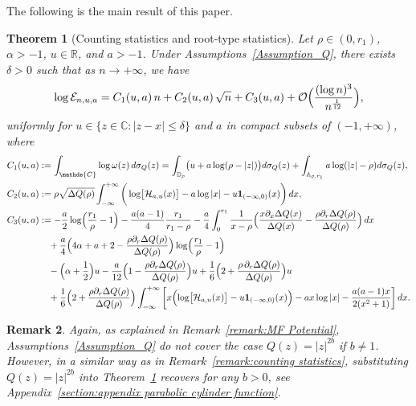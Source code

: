 \documentclass[reqno]{amsart}
\newcommand{\1}{\mathds{1}}
\newcommand{\C}{\mathds{C}}
\newcommand{\R}{\mathds{R}}
\numberwithin{equation}{section}
\newtheorem{theorem}{Theorem}[section]
\newtheorem{remark}[theorem]{Remark}
\theoremstyle{definition}
\begin{document}
The following is the main result of this paper. 
\begin{theorem}[Counting statistics and root-type statistics]
\label{theorem:calEn expansion}
Let $\rho\in(0,r_1)$, $\alpha>-1$, $u\in\R$, and $a>-1$. 
Under Assumptions~\ref{Assumption_Q}, there exists $\delta>0$ such that as $n\to+\infty$, we have 
\begin{equation}
\label{def of expansion of calEnua}
\log\mathcal{E}_{n,u,a}=C_1(u,a)\,n+C_2(u,a)\,\sqrt{n}+C_3(u,a)+\mathcal{O}\Bigl(\frac{(\log n)^3}{n^{\frac{1}{12}}}\Bigr),
\end{equation}
uniformly for $u\in\{z\in\C:|z-x|\leq \delta\}$ and $a$ in compact subsets of $(-1,+\infty)$, where 
\begin{align}
\label{def of mathcal En constant C1}
C_1(u,a)&:=
\int_{\C}\log\omega(z)\,d\sigma_{Q}(z)
=
\int_{\mathbb{D}_{\rho}}\bigl(u+a\log(\rho-|z|)\bigr)d\sigma_Q(z)
+\int_{\mathbb{A}_{\rho,r_1}}a\log (|z|-\rho)d\sigma_Q(z), 
\\
\label{def of mathcal En constant C2}
C_2(u,a)&:=
\rho\sqrt{\Delta Q(\rho)}
\int_{-\infty}^{+\infty}
\bigg(\log\bigl[\mathcal{H}_{a,u}(x)\bigr]
-a\log|x|-u\mathbf{1}_{(-\infty,0)}(x)
\bigg)
\,dx,
\\
C_3(u,a)&:=
-\frac{a}{2}\log\Bigl(\frac{r_1}{\rho}-1\Bigr)
-\frac{a(a-1)}{4}
\frac{r_1}{r_1-\rho}
-
\frac{a}{4}
\int_{0}^{r_1}
\frac{1}{x-\rho}
\Bigl(
\frac{x\partial_x\Delta Q(x)}{\Delta Q(x)}
-
\frac{\rho\partial_r\Delta Q(\rho)}{\Delta Q(\rho)}
\Bigr)
\,dx
\nonumber
\\
&\quad
+
\frac{a}{4}\Bigl(
4\alpha+a+2-\frac{\rho\partial_r\Delta Q(\rho)}{\Delta Q(\rho)}
\Bigr)\log\Bigl(\frac{r_1}{\rho}-1\Bigr)
\label{def of mathcal En constant C3}
\\
&\quad
-
\Bigl(\alpha+\frac{1}{2}\Bigr)u
-
\frac{a}{12}\Bigl(1-\frac{\rho\partial_r\Delta Q(\rho)}{\Delta Q(\rho)}\Bigr)u
+\frac{1}{6}\Bigl(2+\frac{\rho\,\partial_r\Delta Q(\rho)}{\Delta Q(\rho)}\Bigr)u
\nonumber
\\
&\quad 
+\frac{1}{6}\Bigl(2+\frac{\rho\partial_r\Delta Q(\rho)}{\Delta Q(\rho)}\Bigr)
\int_{-\infty}^{+\infty}
\bigg[
x\Bigl(\log\bigl[\mathcal{H}_{a,u}(x)\bigr] 
- u\mathbf{1}_{(-\infty,0)}(x)
\Big)
-ax\log|x| 
-\frac{a(a-1)x}{2(x^2+1)}
\bigg]\,dx. 
\nonumber
\end{align}
\end{theorem}
\begin{remark}\label{remark for theorem cal EN 1}
Again, as explained in Remark~\ref{remark:MF Potential}, Assumptions~\ref{Assumption_Q} do not cover the case $Q(z)=|z|^{2b}$ if $b\neq1$.  
However, in a similar way as in Remark~\ref{remark:counting statistics}, substituting $Q(z)=|z|^{2b}$ into Theorem~\ref{theorem:calEn expansion} recovers \cite[Theorem~1.1]{BC2022} for any $b>0$, see Appendix~\ref{section:appendix parabolic cylinder function}.
\end{remark}
\end{document}
